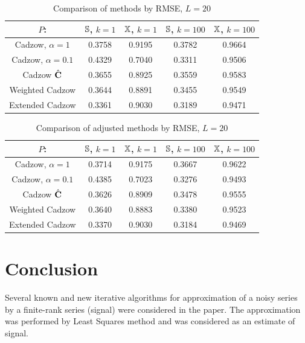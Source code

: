 \documentclass[sii]{ipart}
\begin{document}
\begin{table}
		\caption{Comparison of methods by RMSE, $L = 20$}\label{fintable}

		\begin{tabular*}{\textwidth}{@{\extracolsep{\fill}}ccccc}
			\hline
			$P$: & $\mathbb{S}$, $k = 1$ & $\mathbb{X}$, $k = 1$ & $\mathbb{S}$, $k = 100$ & $\mathbb{X}$, $k = 100$  \\
			\hline
			Cadzow, $\alpha = 1$ & 0.3758 & 0.9195 & 0.3782 & 0.9664 \\
			\hline
			Cadzow, $\alpha = 0.1$ & 0.4329 & 0.7040 & 0.3311 & 0.9506 \\
			\hline
			Cadzow $\hat{\mathbf{C}}$ & 0.3655 & 0.8925 & 0.3559 & 0.9583 \\
			\hline
			Weighted Cadzow & 0.3644 & 0.8891 & 0.3455 & 0.9549 \\
			\hline
			Extended Cadzow & 0.3361 & 0.9030 & 0.3189 & 0.9471 \\
			\hline
		\end{tabular*}
\end{table}

\begin{table}
	\begin{center}
		\caption{Comparison of adjusted methods by RMSE, $L = 20$}\label{fintable_improved}
		\begin{tabular*}{\textwidth}{@{\extracolsep{\fill}}ccccc}
			\hline
			$P$: & $\mathbb{S}$, $k = 1$ & $\mathbb{X}$, $k = 1$ & $\mathbb{S}$, $k = 100$ & $\mathbb{X}$, $k = 100$  \\
			\hline
			Cadzow, $\alpha = 1$ & 0.3714 & 0.9175 & 0.3667 & 0.9622 \\
			\hline
			Cadzow, $\alpha = 0.1$ & 0.4385 & 0.7023 & 0.3276 & 0.9493 \\
			\hline
			Cadzow $\hat{\mathbf{C}}$ & 0.3626 & 0.8909 & 0.3478 & 0.9555 \\
			\hline
			Weighted Cadzow & 0.3640 & 0.8883 & 0.3380 & 0.9523 \\
			\hline
			Extended Cadzow & 0.3370 & 0.9030 & 0.3184 & 0.9469 \\
			\hline
		\end{tabular*}
	\end{center}
\end{table}

\section{Conclusion}
\label{sec:concl}
Several known and new iterative algorithms for approximation of a noisy series by a finite-rank series (signal) were considered in the paper. The approximation was performed by Least Squares method and was considered as an estimate of signal.
\end{document}

